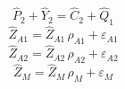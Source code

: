 \begin{dmath}
{{\hat{P}_{2}}}+{{\hat{Y}_{2}}}={{\hat{C}_{2}}}+{{\hat{Q}_{1}}}
\end{dmath}
\begin{dmath}
{{\hat{Z}_{A1}}}={{\hat{Z}_{A1}}}\, {{\rho_{A1}}}+{{\varepsilon_{A1}}}
\end{dmath}
\begin{dmath}
{{\hat{Z}_{A2}}}={{\hat{Z}_{A2}}}\, {{\rho_{A2}}}+{{\varepsilon_{A2}}}
\end{dmath}
\begin{dmath}
{{\hat{Z}_M}}={{\hat{Z}_M}}\, {{\rho_{M}}}+{{\varepsilon_{M}}}
\end{dmath}
